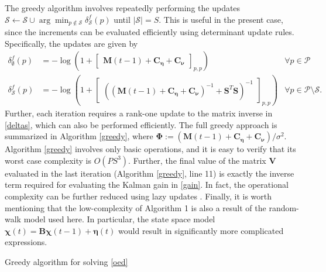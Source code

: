 \documentclass[draftcls,onecolumn,12pt]{IEEEtran}
\providecommand{\abs}[1]{\lvert#1\rvert}												\renewcommand{\b}[1]{\ensuremath{\mathbf{#1}}}		 							\newcommand{\bs}[1]{\ensuremath{\boldsymbol{#1}}}		 						\renewcommand{\c}[1]{\ensuremath{\mathcal{#1}}} 								\newcommand{\E}[1]{\ensuremath{\mathbb{E}\left[#1\right]}} 		  \newcommand{\Es}[1]{\ensuremath{\mathbb{E}^{*}\left[#1\right]}} \newcommand{\ind}{1\hspace{-1.6mm}1}														\newcommand{\norm}[1]{\ensuremath{\left\|#1\right\|}}						\newcommand{\tb}[1]{\ensuremath{\tilde{\mathbf{#1}}}}		 				\newcommand{\mat}[1]{\ensuremath{\begin{bmatrix}#1\end{bmatrix}}}
\def \ceta {{\b{C}_{\bs{\eta}}}}
\def \cnu {{\b{C}_{\bs{\nu}}}}
\def \P {{\c{P}}}
\def \S {{\c{S}}}
\theoremstyle{plain}\newtheorem{thm}{Theorem}
\theoremstyle{definition}
\theoremstyle{remark}
\begin{document}
The greedy algorithm involves repeatedly performing the updates $\S \gets \S \cup \arg\min_{p\notin\S}\delta^f_{\S}(p)$ until $\abs{\S}=S$. This is useful in the present case, since the increments can be evaluated efficiently using determinant update rules. Specifically, the updates are given by
\begin{align}
\delta^f_{\emptyset}(p) &= -\log\left(1+\mat{\b{M}(t-1)+\ceta+\cnu}_{p,p}\right) & \forall p \in \P \\
\delta^f_{\S}(p) &= -\log\left(1+\mat{\left((\b{M}(t-1)+\ceta+\cnu)^{-1}+\b{S}^T\b{S}\right)^{-1}}_{p,p}\right) &\forall p\in\P\setminus\S.\label{deltas}
\end{align}
Further, each iteration requires a rank-one update to the matrix inverse in \eqref{deltas}, which can also be performed efficiently. 
The full greedy approach is summarized in Algorithm \ref{greedy}, where $\bs{\Phi}:=(\b{M}(t-1)+\ceta+\cnu)/{\sigma^2}$. 
Algorithm \ref{greedy} involves only basic operations, and it is easy to verify that its worst case complexity is $O(PS^3)$.
Further, the final value of the matrix $\b{V}$ evaluated in the last iteration (Algorithm \ref{greedy}, line 11) is exactly the inverse term required for evaluating the Kalman gain in \eqref{gain}.
In fact, the operational complexity can be further reduced using lazy updates \cite{minoux}. 
{ Finally, it is worth mentioning that the low-complexity of Algorithm 1 is also a result of the random-walk model used here. In particular, the state space model $\bs{\chi}(t) = \bs{B}\bs{\chi}(t-1) + \bs{\eta}(t)$ would result in significantly more complicated expressions. }


\begin{algorithm}
\caption{Greedy algorithm for solving \eqref{oed}}\label{greedy}
\end{algorithm}
\end{document}
